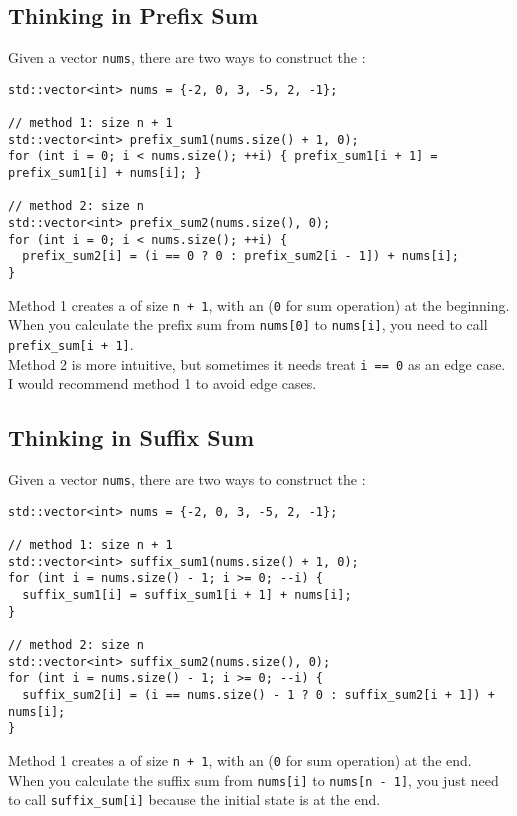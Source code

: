 \subsection{Thinking in Prefix Sum}
Given a vector {\colorbox{CodeBackground}{\lstinline|nums|}}, there are two ways to construct the {\color{blue}{prefix sum vector}}:
\begin{lstlisting}
std::vector<int> nums = {-2, 0, 3, -5, 2, -1};

// method 1: size n + 1
std::vector<int> prefix_sum1(nums.size() + 1, 0);
for (int i = 0; i < nums.size(); ++i) { prefix_sum1[i + 1] = prefix_sum1[i] + nums[i]; }

// method 2: size n
std::vector<int> prefix_sum2(nums.size(), 0);
for (int i = 0; i < nums.size(); ++i) {
  prefix_sum2[i] = (i == 0 ? 0 : prefix_sum2[i - 1]) + nums[i];
}
\end{lstlisting}
Method 1 creates a {\color{blue}{prefix sum vector}} of size {\colorbox{CodeBackground}{\lstinline|n + 1|}}, with an {\color{blue}{initial state}} ({\colorbox{CodeBackground}{\lstinline|0|}} for sum operation) at the beginning. When you calculate the prefix sum from {\colorbox{CodeBackground}{\lstinline|nums[0]|}} to {\colorbox{CodeBackground}{\lstinline|nums[i]|}}, you need to call {\colorbox{CodeBackground}{\lstinline|prefix_sum[i + 1]|}}.\\

Method 2 is more intuitive, but sometimes it needs treat {\colorbox{CodeBackground}{\lstinline|i == 0|}} as an edge case.\\

I would recommend method 1 to avoid edge cases.

\subsection{Thinking in Suffix Sum}
Given a vector {\colorbox{CodeBackground}{\lstinline|nums|}}, there are two ways to construct the {\color{blue}{suffix sum vector}}:
\begin{lstlisting}
std::vector<int> nums = {-2, 0, 3, -5, 2, -1};

// method 1: size n + 1
std::vector<int> suffix_sum1(nums.size() + 1, 0);
for (int i = nums.size() - 1; i >= 0; --i) {
  suffix_sum1[i] = suffix_sum1[i + 1] + nums[i];
}

// method 2: size n
std::vector<int> suffix_sum2(nums.size(), 0);
for (int i = nums.size() - 1; i >= 0; --i) {
  suffix_sum2[i] = (i == nums.size() - 1 ? 0 : suffix_sum2[i + 1]) + nums[i];
}
\end{lstlisting}
Method 1 creates a {\color{blue}{suffix sum vector}} of size {\colorbox{CodeBackground}{\lstinline|n + 1|}}, with an {\color{blue}{initial state}} ({\colorbox{CodeBackground}{\lstinline|0|}} for sum operation) at the end. When you calculate the suffix sum from {\colorbox{CodeBackground}{\lstinline|nums[i]|}} to {\colorbox{CodeBackground}{\lstinline|nums[n - 1]|}}, you just need to call {\colorbox{CodeBackground}{\lstinline|suffix_sum[i]|}} because the initial state is at the end.\\

